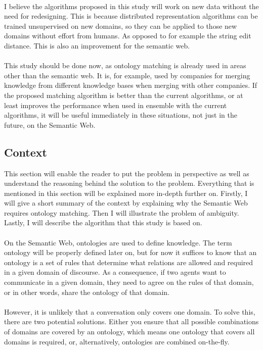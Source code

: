 \documentclass{article}
\begin{document}
 \paragraph{}
 I believe the algorithms proposed in this study will work on new data without the need for redesigning. This is because distributed representation algorithms can be trained unsupervised on new domains, so they can be applied to those new domains without effort from humans. As opposed to for example the string edit distance. This is also an improvement for the semantic web.
 \paragraph{}
 This study should be done now, as ontology matching is already used in areas other than the semantic web. It is, for example, used by companies for merging knowledge from different knowledge bases when merging with other companies. If the proposed matching algorithm is better than the current algorithms, or at least improves the performance when used in ensemble with the current algorithms, it will be useful immediately in these situations, not just in the future, on the Semantic Web.

 \subsection{Context}
 This section will enable the reader to put the problem in perspective as well as understand the reasoning behind the solution to the problem. Everything that is mentioned in this section will be explained more in-depth further on.
 Firstly, I will give a short summary of the context by explaining why the Semantic Web requires ontology matching. Then I will illustrate the problem of ambiguity. Lastly, I will describe the algorithm that this study is based on.
 \paragraph{}
 On the Semantic Web, ontologies are used to define knowledge\cite{fensel2001ontologies}.
 The term ontology will be properly defined later on, but for now it suffices to know that an ontology is a set of rules that determine what relations are allowed and required in a given domain of discourse. As a consequence, if two agents want to communicate in a given domain, they need to agree on the rules of that domain, or in other words, share the ontology of that domain.
 \paragraph{}
 However, it is unlikely that a conversation only covers one domain. To solve this, there are two potential solutions. Either you ensure that all possible combinations of domains are covered by an ontology, which means one ontology that covers all domains is required, or, alternatively, ontologies are combined on-the-fly.
\end{document}
